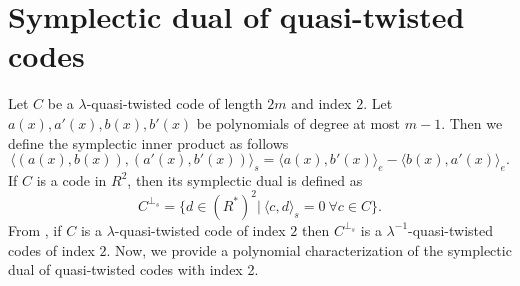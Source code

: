 \documentclass[12 pt]{extarticle}
\numberwithin{equation}{section}
\theoremstyle{definition}
\begin{document}
\section{Symplectic dual of quasi-twisted codes}\label{dualcodess}
Let $C$ be a $\lambda$-quasi-twisted code of length $2m$ and index $2$. Let $a(x),a'(x),b(x),b'(x)$ be polynomials of degree at most $m-1$. Then we define the symplectic inner product as follows
\begin{equation}\label{symdef}
    \langle (a(x),b(x)),(a'(x),b'(x))\rangle_s=\langle a(x),b'(x)\rangle_e-\langle b(x),a'(x)\rangle_e.
\end{equation}
If $C$ is a code in $R^2$, then its symplectic dual is defined as 
$$C^{\perp_s}=\{d\in (R^*)^2 | \ \langle c, d \rangle_s=0 \ \forall c\in C\}.$$
From \cite{ezerman2024}, if $C$ 
is a $\lambda$-quasi-twisted code of index $2$ then $C^{\perp_s}$ is a $\lambda^{-1}$-quasi-twisted codes of index $2$. Now, we provide a polynomial characterization of the symplectic dual of quasi-twisted codes with index 2.
\end{document}
